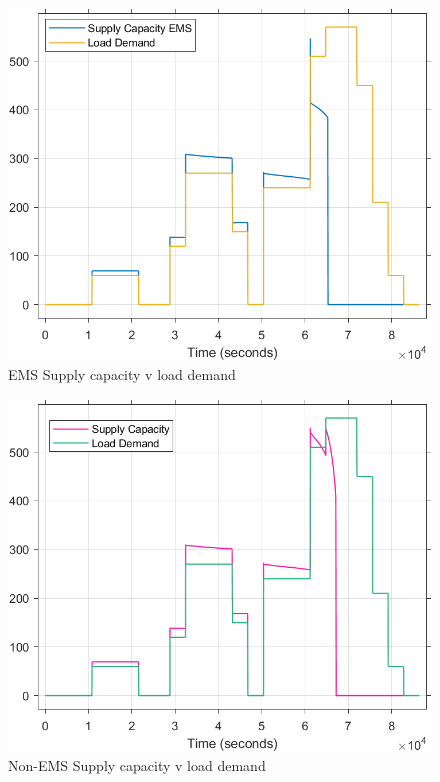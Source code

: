\begin{figure}[H]
	\centering
	\includegraphics[totalheight=8cm]{Figures/ems supply capacity v load demand2.png}
	\caption{EMS Supply capacity v load demand}
\end{figure}
\begin{figure}[H]
	\centering
	\includegraphics[totalheight=8cm]{Figures/non-ems supply capacity v load demand3.png}
	\caption{Non-EMS Supply capacity v load demand}
\end{figure}

